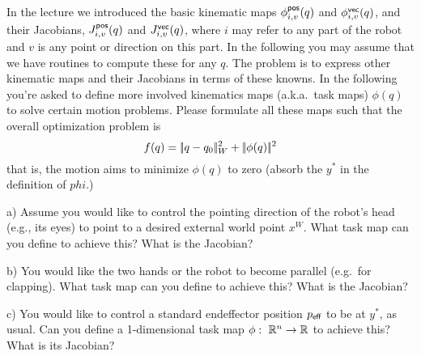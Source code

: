 

\renewcommand{\course}{Robotics}
\renewcommand{\coursepicture}{roboticsLecture}
\renewcommand{\coursedate}{Winter 2014}
\renewcommand{\exnum}{3}

\exercises


\exercisestitle




In the lecture we introduced the basic kinematic maps
$\phi^{\textsf{pos}}_{i,v}(q)$ and $\phi^{\textsf{vec}}_{i,v}(q)$, and their Jacobians,
$J^{\textsf{pos}}_{i,v}(q)$ and $J^{\textsf{vec}}_{i,v}(q)$, where $i$ may refer to any
part of the robot and $v$ is any point or direction on this part. In
the following you may assume that we have routines to compute these
for any $q$. The problem is to express other kinematic maps and their
Jacobians in terms of these knowns. In the following you're asked to
define more involved kinematics maps (a.k.a.\ task maps) $\phi(q)$ to solve
certain motion problems. Please formulate all these maps such that the
overall optimization problem is
$$ f(q) = |\!|q-q_0|\!|^2_W + |\!|\phi(q)|\!|^2 $$
that is, the motion aims to minimize $\phi(q)$ to zero (absorb the
$y^*$ in the definition of $phi$.)

a) Assume you would like to control the pointing direction of the robot's
head (e.g., its eyes) to point to a desired external world point $x^W$. What
task map can you define to achieve this? What is the Jacobian?


b) You would like the two hands or the robot to become parallel
(e.g.\ for clapping). What task map can you define to achieve this?
What is the Jacobian?


c) You would like to control a standard endeffector position $p_{\textsf{eff}}$
to be at $y^*$, as usual. Can you define a 1-dimensional task map
$\phi:~ {\mathbb{R}}^n \to {\mathbb{R}}$ to achieve this? What is its Jacobian?



